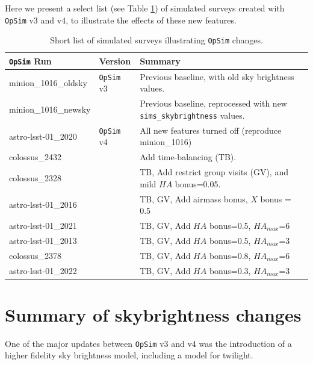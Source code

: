 \documentclass[DM,lsstdraft,authoryear,toc]{lsstdoc}
\newcommand{\opsim}{\texttt{OpSim}\xspace}
\newcommand{\simsky}{\texttt{sims\_skybrightness}\xspace}
\begin{document}
Here we present a select list (see Table \ref{tab:runlist}) of simulated surveys created with \opsim v3 and v4, to illustrate the effects of these new features. 

\begin{table}[htp]
\caption{Short list of simulated surveys illustrating \opsim changes.}
\begin{center}
\begin{tabular}{ l | l | l }
\opsim Run & Version & Summary \\
\hline
minion\_1016\_oldsky & \opsim v3 & Previous baseline, with old sky brightness values. \\
minion\_1016\_newsky &  & Previous baseline, reprocessed with new \simsky values.\\
astro-lsst-01\_2020 & \opsim v4  & All new features turned off (reproduce minion\_1016) \\
colossus\_2432 &  & Add time-balancing (TB).\\
colossus\_2328 &  & TB, Add restrict group visits (GV), and mild $HA$ bonus=0.05. \\
astro-lsst-01\_2016 &  & TB, GV, Add airmass bonus, $X$ bonus = 0.5 \\
astro-lsst-01\_2021 & & TB, GV, Add $HA$ bonus=0.5, $HA_{max}$=6 \\
astro-lsst-01\_2013 &  & TB, GV, Add $HA$ bonus=0.5, $HA_{max}$=3 \\
colossus\_2378 &  &  TB, GV, Add $HA$ bonus=0.8, $HA_{max}$=6 \\
astro-lsst-01\_2022 &   & TB, GV, Add $HA$ bonus=0.3, $HA_{max}$=3 \\
\end{tabular} 
\end{center}
\label{tab:runlist}
\end{table}

\section{Summary of skybrightness changes}

One of the major updates between \opsim v3 and v4 was the introduction of a higher fidelity sky brightness model, including a model for twilight. 
\end{document}
